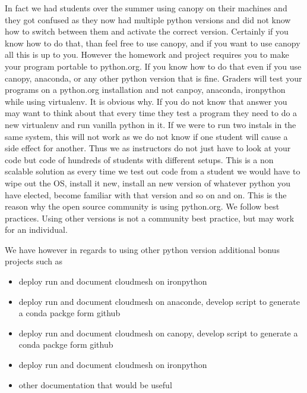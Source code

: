In fact we had students over the summer using canopy on their machines
and they got confused as they now had multiple python versions and did
not know how to switch between them and activate the correct
version. Certainly if you know how to do that, than feel free to use
canopy, and if you want to use canopy all this is up to you. However
the homework and project requires you to make your program portable to
python.org. If you know how to do that even if you use canopy,
anaconda, or any other python version that is fine. Graders will test
your programs on a python.org installation and not canpoy, anaconda,
ironpython while using virtualenv. It is obvious why. If you do not
know that answer you may want to think about that every time they test
a program they need to do a new virtualenv and run vanilla python in
it. If we were to run two instals in the same system, this will not
work as we do not know if one student will cause a side effect for
another. Thus we as instructors do not just have to look at your code
but code of hundreds of students with different setups. This is a non
scalable solution as every time we test out code from a student we
would have to wipe out the OS, install it new, install an new version
of whatever python you have elected, become familiar with that version
and so on and on. This is the reason why the open source community is
using python.org. We follow best practices. Using other versions is
not a community best practice, but may work for an individual.

We have however in regards to using other python version additional
bonus projects such as
\begin{itemize}
\item {} 
deploy run and document cloudmesh on ironpython

\item {} 
deploy run and document cloudmesh on anaconde, develop script to
generate a conda packge form github

\item {} 
deploy run and document cloudmesh on canopy, develop script to
generate a conda packge form github

\item {} 
deploy run and document cloudmesh on ironpython

\item {} 
other documentation that would be useful

\end{itemize}


